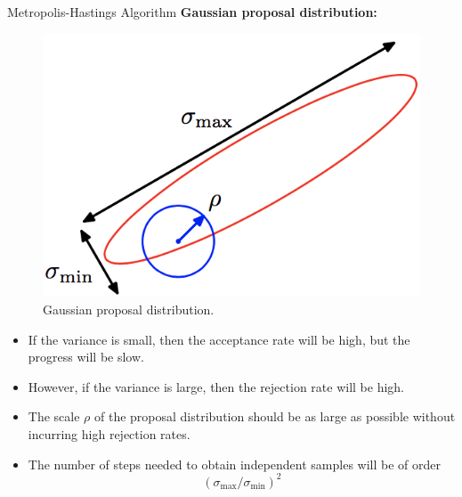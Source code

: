 \documentclass{bredelebeamer}
\begin{document}
\begin{frame}{Metropolis-Hastings Algorithm}
  \textbf{Gaussian proposal distribution:}
  \begin{figure}
  \centering
  \includegraphics[scale=0.4]{gaussian_proposal.png}
  \caption{
    Gaussian proposal distribution.
  }
  \end{figure}
  \begin{itemize}
    \item If the variance is small, then the acceptance rate will be high,
    but the progress will be slow.
    \item However, if the variance is large, then the rejection rate will
    be high.
    \item The scale $\rho$ of the proposal distribution should be as large
    as possible without incurring high rejection rates.
    \item The number of steps needed to obtain independent samples will be
    of order
    \begin{equation}
      {( \sigma_{\textrm{max}} / \sigma_{\textrm{min}} )}^2
    \end{equation}
  \end{itemize}
\end{frame}
\end{document}
